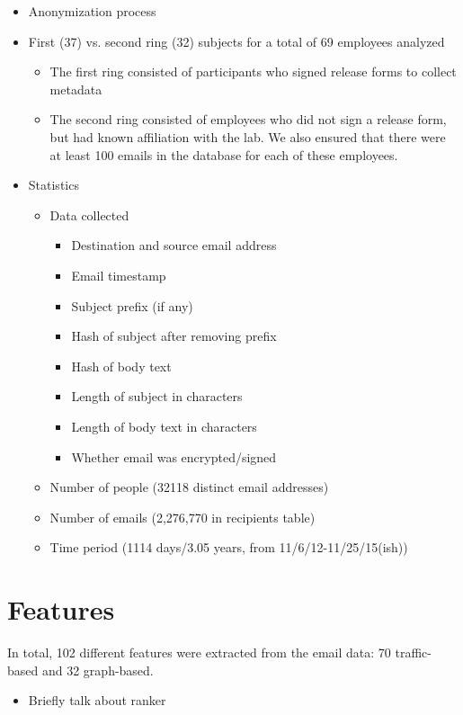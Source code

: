 \documentclass{article}
\begin{document}
\begin{itemize}
\item Anonymization process
\item First (37) vs. second ring (32) subjects for a total of 69 employees analyzed
    \begin{itemize}
    \item The first ring consisted of participants who signed release forms to collect metadata
    \item The second ring consisted of employees who did not sign a release form, but had known affiliation with the lab.  We also ensured that there were at least 100 emails in the database for each of these employees.
    \end{itemize}
\item Statistics
    \begin{itemize}
    \item Data collected
        \begin{itemize}
        \item Destination and source email address
        \item Email timestamp
        \item Subject prefix (if any)
        \item Hash of subject after removing prefix
        \item Hash of body text
        \item Length of subject in characters
        \item Length of body text in characters
        \item Whether email was encrypted/signed
        \end{itemize}
    \item Number of people (32118 distinct email addresses)
    \item Number of emails (2,276,770 in recipients table)
    \item Time period (1114 days/3.05 years, from 11/6/12-11/25/15(ish))
    \end{itemize}
\end{itemize}



\section{Features} \label{Features}
In total, 102 different features were extracted from the email data: 70 traffic-based and 32 graph-based.
\begin{itemize}
\item Briefly talk about ranker
\end{itemize}
\end{document}
